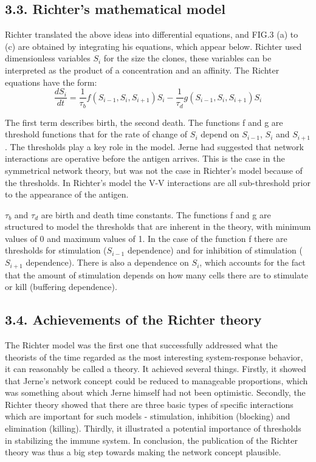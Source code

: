 \documentclass[Proceedings]{ascelike}
\begin{document}
\subsection{3.3. Richter's mathematical model}
Richter translated the above ideas into differential equations, and FIG.3 (a) to (c) are obtained by integrating his equations, which appear below. Richter used dimensionless variables \boldmath$S_{i}$ for the size the clones, these variables can be interpreted as the product of a concentration and an affinity. The Richter equations have the form:
\begin{equation}{
    \frac{dS_{i}}{dt}=\frac{1}{\tau _{b}}f(S_{i-1},S_{i},S_{i+1})S_{i}-\frac{1}{\tau _{d}}g(S_{i-1},S_{i},S_{i+1})S_{i}}
\end{equation}
\par
The first term describes birth, the second death. The functions f and g are threshold functions that for the rate of change of \boldmath$S_{i}$ depend on \boldmath$S_{i-1}$, \boldmath$S_{i}$ and \boldmath$S_{i+1}$. The thresholds play a key role in the model. Jerne had suggested that network interactions are operative before the antigen arrives. This is the case in the symmetrical network theory, but was not the case in Richter's model because of the thresholds. In Richter's model the V-V interactions are all sub-threshold prior to the appearance of the antigen.
\par
\boldmath$\tau _{b}$ and \boldmath$\tau _{d}$ are birth and death time constants. The functions f and g are structured to model the thresholds that are inherent in the theory, with minimum values of 0 and maximum values of 1. In the case of the function f there are thresholds for stimulation (\boldmath$S_{i-1}$ dependence) and for inhibition of stimulation (\boldmath$S_{i+1}$ dependence). There is also a dependence on \boldmath$S_{i}$, which accounts for the fact that the amount of stimulation depends on how many cells there are to stimulate or kill (buffering dependence).

\subsection{3.4. Achievements of the Richter theory}
The Richter model was the first one that successfully addressed what the theorists of the time regarded as the most interesting system-response behavior, it can reasonably be called a theory. It achieved several things. Firstly, it showed that Jerne's network concept could be reduced to manageable proportions, which was something about which Jerne himself had not been optimistic. Secondly, the Richter theory showed that there are three basic types of specific interactions which are important for such models - stimulation, inhibition (blocking) and elimination (killing). Thirdly, it illustrated a potential importance of thresholds in stabilizing the immune system. In conclusion, the publication of the Richter theory was thus a big step towards making the network concept plausible.
\end{document}
